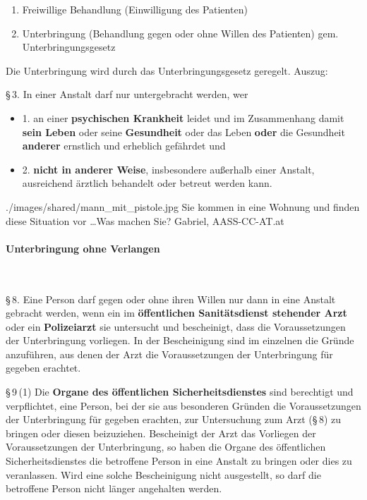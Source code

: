 {
\begin{enumerate}
  \item Freiwillige Behandlung (Einwilligung des Patienten)
  \item Unterbringung (Behandlung gegen oder ohne Willen
  des Patienten) gem. Unterbringungsgesetz
\end{enumerate}


Die Unterbringung wird durch das
Unterbringungsgesetz geregelt. Auszug:

{\S}\,3. In einer Anstalt darf nur untergebracht werden, wer
\begin{itemize}
  \item 1. an einer \textbf{psychischen Krankheit} leidet und im Zusammenhang
  damit \textbf{sein Leben} oder seine \textbf{Gesundheit} oder das Leben
  \textbf{oder} die Gesundheit \textbf{anderer} ernstlich und erheblich
  gefährdet und
  \item 2. \textbf{nicht in anderer Weise}, insbesondere außerhalb einer
  Anstalt, ausreichend ärztlich behandelt oder betreut werden kann.
\end{itemize}

}{}
{./images/shared/mann_mit_pistole.jpg}
{Sie kommen in eine Wohnung und finden diese
Situation vor \ldots Was machen Sie?}
{Gabriel, AASS-CC-AT.at}





\paragraph{Unterbringung ohne Verlangen}~

{\S}\,8. Eine Person darf gegen oder ohne ihren Willen nur dann in eine
Anstalt gebracht werden, wenn ein im \textbf{öffentlichen
Sanitätsdienst stehender Arzt} oder ein \textbf{Polizeiarzt} sie
untersucht und bescheinigt, dass die Voraussetzungen der
Unterbringung vorliegen. In der Bescheinigung sind im einzelnen die
Gründe anzuführen, aus denen der Arzt die Voraussetzungen der
Unterbringung für gegeben erachtet.

{\S}\,9\,(1) Die \textbf{Organe des öffentlichen Sicherheitsdienstes}
sind berechtigt und verpflichtet, eine Person, bei der sie aus
besonderen Gründen die Voraussetzungen der Unterbringung für
gegeben erachten, zur Untersuchung zum Arzt ({\S}\,8) zu bringen oder
diesen beizuziehen. Bescheinigt der Arzt das Vorliegen der
Voraussetzungen der Unterbringung, so haben die Organe des
öffentlichen Sicherheitsdienstes die betroffene Person in eine
Anstalt zu bringen oder dies zu veranlassen. Wird eine solche
Bescheinigung nicht ausgestellt, so darf die betroffene Person nicht
länger angehalten werden.

